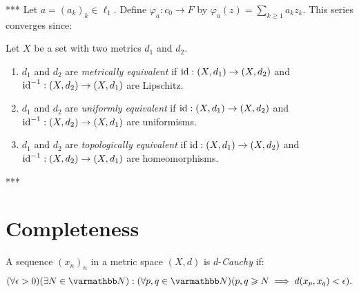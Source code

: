    \begin{example}***
        Let $a = (a_k)_k \in \ell_1$. Define $\varphi_a:c_0 \rightarrow F$ by $\varphi_a(z) = \sum_{k \geq 1}a_k z_k$. This series converges since:
    \end{example}

    \begin{definition}
        Let $X$ be a set with two metrics $d_1$ and $d_2$.
        \begin{enumerate}[label = (\arabic*),itemsep=1pt,topsep=3pt]
            \item $d_1$ and $d_2$ are \textit{metrically equivalent} if $\operatorname{id}:(X,d_1) \rightarrow (X,d_2)$ and $\operatorname{id}^{-1}:(X,d_2) \rightarrow (X,d_1)$ are Lipschitz.
            \item $d_1$ and $d_2$ are \textit{uniformly equivalent} if $\operatorname{id}:(X,d_1) \rightarrow (X,d_2)$ and $\operatorname{id}^{-1}:(X,d_2) \rightarrow (X,d_1)$ are uniformisms.
            \item $d_1$ and $d_2$ are \textit{topologically equivalent} if $\operatorname{id}:(X,d_1) \rightarrow (X,d_2)$ and $\operatorname{id}^{-1}:(X,d_2) \rightarrow (X,d_1)$ are homeomorphisms.
        \end{enumerate}
    \end{definition}

    \begin{example}***
        
    \end{example}

\section{Completeness}\label{sec:completeness}
    \begin{definition}
        A sequence $(x_n)_n$ in a metric space $(X,d)$ is $d$-\textit{Cauchy} if:
            \begin{equation*}
            \begin{split}
                (\forall \epsilon > 0)(\exists N \in \bfN): (\forall p,q \in \bfN)(p,q \geq N \implies d(x_p,x_q) < \epsilon).
            \end{split}
            \end{equation*}
    \end{definition}

